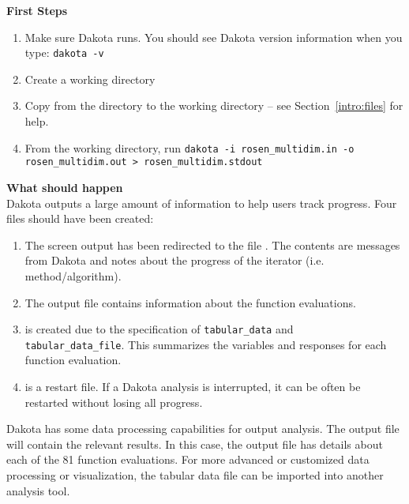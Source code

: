 {\bf First Steps}
\begin{enumerate}
  \item Make sure Dakota runs. You should see Dakota version information
   when you type: \texttt{dakota -v}
  \item Create a working directory 
  \item Copy  from the 
    directory to the working directory -- see Section~\ref{intro:files} for help.
  \item From the working directory, run \texttt{dakota -i 
    rosen\_multidim.in -o rosen\_multidim.out > rosen\_multidim.stdout}
\end{enumerate}

{\bf What should happen} \\
Dakota outputs a large amount of information to help users track  progress. 
Four files should have been created:
\begin{enumerate}
  \item The screen output has been redirected to the file
    .  The contents are messages from
    Dakota and notes about the progress of the iterator
    (i.e. method/algorithm).
  \item The output file  contains information
    about the function evaluations.
  \item {} is created due to the specification
    of \texttt{tabular\_data} and
    \\ \texttt{tabular\_data\_file}. This summarizes the variables and
    responses for each function evaluation.
  \item {} is a restart file. If a Dakota analysis is
    interrupted, it can be often be restarted without losing all
    progress.
\end{enumerate}
Dakota has some data processing capabilities for output analysis. 
The output file will contain the relevant results. 
In this case, the output file has details
about each of the 81 function evaluations. 
For more advanced or customized data 
processing or visualization, the tabular data file can be imported into 
another analysis tool. 

